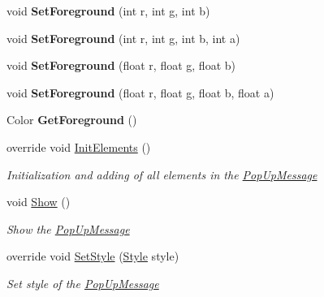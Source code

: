 \begin{DoxyCompactItemize}
\mbox{\label{class_space_v_i_l_1_1_pop_up_message_af2a00344c44105b2d113c84955682c0c}} 
void {\bfseries Set\+Foreground} (int r, int g, int b)
\item 
\mbox{\label{class_space_v_i_l_1_1_pop_up_message_aff095ddb6c50188e68ab59dc14e39ba4}} 
void {\bfseries Set\+Foreground} (int r, int g, int b, int a)
\item 
\mbox{\label{class_space_v_i_l_1_1_pop_up_message_ae09a19a3c2d798abcd14b6b8aef8d505}} 
void {\bfseries Set\+Foreground} (float r, float g, float b)
\item 
\mbox{\label{class_space_v_i_l_1_1_pop_up_message_ad3b65677421d443abb2c1e93d25bbaef}} 
void {\bfseries Set\+Foreground} (float r, float g, float b, float a)
\item 
\mbox{\label{class_space_v_i_l_1_1_pop_up_message_aac84ef35ee85dadc98de2ac08ead1156}} 
Color {\bfseries Get\+Foreground} ()
\item 
override void \mbox{\hyperlink{class_space_v_i_l_1_1_pop_up_message_a34573fddbd8492ec1261c65f59dd3bbb}{Init\+Elements}} ()
\begin{DoxyCompactList}\small\item\em Initialization and adding of all elements in the \mbox{\hyperlink{class_space_v_i_l_1_1_pop_up_message}{Pop\+Up\+Message}} \end{DoxyCompactList}\item 
void \mbox{\hyperlink{class_space_v_i_l_1_1_pop_up_message_acd66fca578bf2547f983d48650b0f618}{Show}} ()
\begin{DoxyCompactList}\small\item\em Show the \mbox{\hyperlink{class_space_v_i_l_1_1_pop_up_message}{Pop\+Up\+Message}} \end{DoxyCompactList}\item 
override void \mbox{\hyperlink{class_space_v_i_l_1_1_pop_up_message_adeaf6b8c53f63d24c8342182ac699708}{Set\+Style}} (\mbox{\hyperlink{class_space_v_i_l_1_1_decorations_1_1_style}{Style}} style)
\begin{DoxyCompactList}\small\item\em Set style of the \mbox{\hyperlink{class_space_v_i_l_1_1_pop_up_message}{Pop\+Up\+Message}} \end{DoxyCompactList}\end{DoxyCompactItemize}
